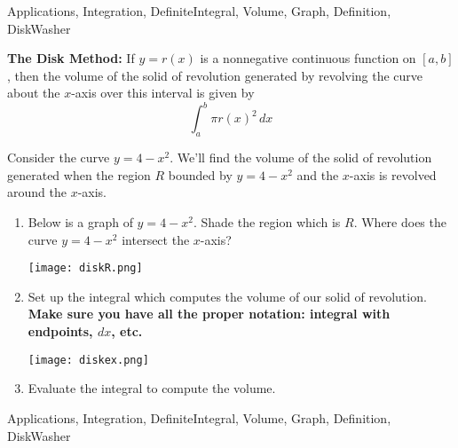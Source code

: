 \begin{tagblock}{Applications, Integration, DefiniteIntegral, Volume, Graph, Definition, DiskWasher}
\begin{question}
	


\textbf{The Disk Method:} If $y=r(x)$ is a nonnegative continuous function on $[a,b]$, then the volume of the solid of revolution generated by revolving the curve about the 
$x$-axis over this interval is given by
\[ \int_a^b \pi r(x)^2 \, dx \]

Consider the curve $y=4-x^2$.  We'll find the volume of the solid of revolution generated when the region $R$ bounded by $y=4-x^2$ and the $x$-axis is revolved around the $x$-axis.  
\begin{enumerate}
\item Below is a graph of $y=4-x^2$.  Shade the region which is $R$.  Where does the curve $y=4-x^2$ intersect the $x$-axis?

\texttt{[image: diskR.png]}

\item Set up the integral which computes the volume of our solid of revolution.   \textbf{Make sure you have all the proper notation: integral with endpoints, $dx$, etc.}


\texttt{[image: diskex.png]}

\item Evaluate the integral to compute the volume.


\end{enumerate}

    
\begin{tags}
       Applications, Integration, DefiniteIntegral, Volume, Graph, Definition, DiskWasher
\end{tags}
    
\begin{diary}
\end{diary}
	
\begin{solution}

\end{solution}
	
\end{question}

\end{tagblock}

